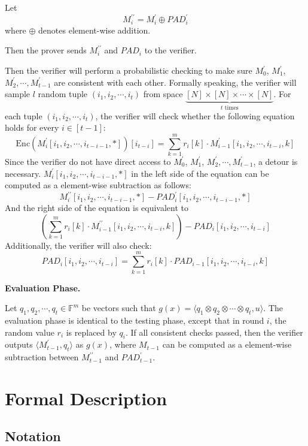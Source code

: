 Let 
$$
M_i^{\prime\prime} = M_i^{\prime} \oplus PAD_i^\prime
$$
where $\oplus$ denotes element-wise addition.

Then the prover sends $M_i^{\prime\prime}$ and $PAD_i$ to the verifier.

Then the verifier will perform a probabilistic checking to make sure 
$M_0^\prime$, $M_1^\prime$, $M_2^\prime, \cdots, M_{t-1}^\prime$ 
are consistent with each other. Formally speaking, the verifier will sample $l$ random tuple $(i_1, i_2, \cdots, i_t)$ from space $\underbrace{[N] \times [N] \times \cdots \times [N]}_{t \text{ times}}$. 
For each tuple $(i_1, i_2, \cdots, i_t)$,
the verifier will check whether the following equation holds for every $i \in [t-1]$:
$$
    \text{Enc}(M_i^\prime[i_1, i_2, \cdots, i_{t-i-1}, *])[i_{t-i}] = \sum_{k=1}^m r_i[k] \cdot M_{i-1}^{\prime}[i_1,i_2, \cdots, i_{t-i},k]
$$
Since the verifier do not have direct access to $M_0^\prime$, $M_1^\prime$, $M_2^\prime, \cdots, M_{t-1}^\prime$, a detour is necessary. $M_i^\prime[i_1, i_2, \cdots, i_{t-i-1}, *]$ in the left side of the equation can be computed as a element-wise subtraction as follows:
$$
    M_i^{\prime\prime}[i_1, i_2, \cdots, i_{t-i-1}, *] - PAD_i^\prime[i_1, i_2, \cdots, i_{t-i-1}, *]
$$
And the right side of the equation is equivalent to 
$$
    (\sum_{k=1}^m r_i[k] \cdot M_{i-1}^{\prime\prime}[i_1,i_2, \cdots, i_{t-i},k]) - PAD_i[i_1, i_2, \cdots, i_{t-i}]
$$
Additionally, the verifier will also check:
$$
    PAD_i[i_1, i_2, \cdots, i_{t-i}] = \sum_{k=1}^m r_i[k] \cdot PAD_{i-1}[i_1,i_2, \cdots, i_{t-i},k]
$$

\textbf{Evaluation Phase.}

Let $q_1, q_2, \cdots, q_t \in \mathbb{F}^{m}$ be vectors such that $g(x) =\langle q_1 \otimes q_2 \otimes \cdots \otimes q_t, u \rangle $. The evaluation phase is identical to the testing phase, except that in round $i$, the random value $r_i$ is replaced by $q_i$. If all consistent checks passed, then the verifier outputs $\langle M_{t-1}^{\prime}, q_t \rangle$ as $g(x)$, where $M_{t-1}$ can be computed as a element-wise subtraction between $M_{t-1}^{\prime\prime}$ and $PAD_{t-1}^\prime$.

\section{Formal Description}

\subsection{Notation}

